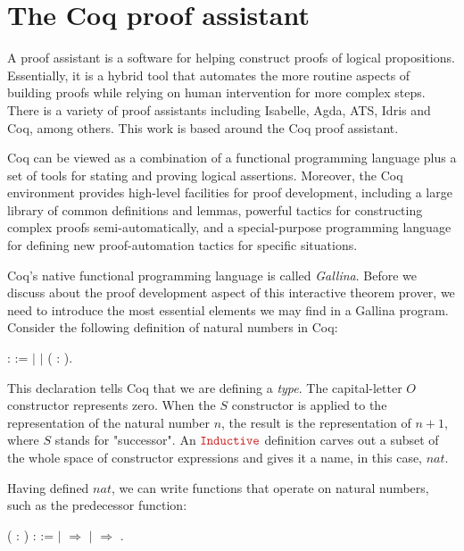 \section{The Coq proof assistant}
\label{section:coq}

A proof assistant is a software for helping construct proofs of logical propositions. Essentially, it is a hybrid tool that automates the more routine aspects of building proofs while relying on human intervention for more complex steps. There is a variety of proof assistants including Isabelle, Agda, ATS, Idris and Coq, among others. This work is based around the Coq proof assistant.

Coq can be viewed as a combination of a functional programming language plus a set of tools for stating and proving logical assertions. Moreover, the Coq environment provides high-level facilities for proof development, including a large library of common definitions and lemmas, powerful tactics for constructing complex proofs semi-automatically, and a special-purpose programming language for defining new proof-automation tactics for specific situations.

Coq's native functional programming language is called \emph{Gallina}. Before we discuss about the proof development aspect of this interactive theorem prover, we need to introduce the most essential elements we may find in a Gallina program. Consider the following definition of natural numbers in Coq:

\begin{coqdoccode}
	\coqdocnoindent
	  :  :=\coqdoceol
	\coqdocindent{1.00em}
	\ensuremath{|} \coqdoceol
	\coqdocindent{1.00em}
	\ensuremath{|}  ( : ).\coqdoceol
\end{coqdoccode}

This declaration tells Coq that we are defining a \emph{type}. The capital-letter $ O $ constructor represents zero. When the $ S $ constructor is applied to the representation of the natural number $ n $, the result is the representation of $ n+1 $, where $ S $ stands for "successor". An $ \coqdockw{Inductive} $ definition carves out a subset of the whole space of constructor expressions and gives it a name, in this case, $ nat $.

Having defined $ nat $, we can write functions that operate on natural numbers, such as the predecessor function:

\begin{coqdoccode}
	\coqdocnoindent
	  ( : ) :  :=\coqdoceol
	\coqdocindent{1.00em}
	  \coqdoceol
	\coqdocindent{2.00em}
	\ensuremath{|}  \ensuremath{\Rightarrow} \coqdoceol
	\coqdocindent{2.00em}
	\ensuremath{|}   \ensuremath{\Rightarrow} \coqdoceol
	\coqdocindent{1.00em}
	.\coqdoceol
\end{coqdoccode}

